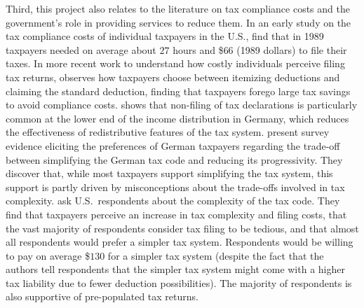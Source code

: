 \documentclass[12pt]{article}
\begin{document}
Third, this project also relates to the literature on tax compliance costs and the government's role in providing services to reduce them. 
In an early study on the tax compliance costs of individual taxpayers in the U.S., \textcite{blumenthal1992compliance} find that in 1989 taxpayers needed on average about $27$ hours and \$$66$ (1989 dollars) to file their taxes. In more recent work to understand how costly individuals perceive filing tax returns, \textcite{benzarti2020taxing} observes how taxpayers choose between itemizing deductions and claiming the standard deduction, finding that taxpayers forego large tax savings to avoid compliance costs. \textcite{hauck2024optional} shows that non-filing of tax declarations is particularly common at the lower end of the income distribution in Germany, which reduces the effectiveness of redistributive features of the tax system. \textcite{blesse2019people} present survey evidence eliciting the preferences of German taxpayers regarding the trade-off between simplifying the German tax code and reducing its progressivity. They discover that, while most taxpayers support simplifying the tax system, this support is partly driven by misconceptions about the trade-offs involved in tax complexity. \textcite{benzarti2024rising} ask U.S.\ respondents about the complexity of the tax code. They find that taxpayers perceive an increase in tax complexity and filing costs, that the vast majority of respondents consider tax filing to be tedious, and that almost all respondents would prefer a simpler tax system. Respondents would be willing to pay on average \$$130$ for a simpler tax system (despite the fact that the authors tell respondents that the simpler tax system might come with a higher tax liability due to fewer deduction possibilities). The majority of respondents is also supportive of pre-populated tax returns.

\end{document}
